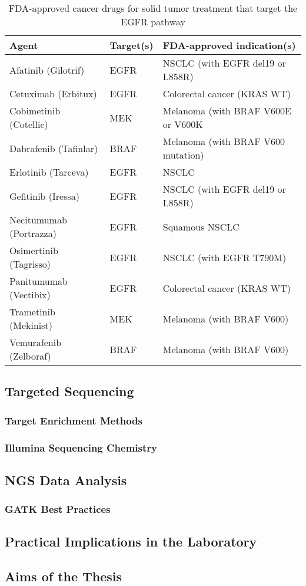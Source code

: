     \begin{table}[!htbp]
        \caption[Targeted Cancer Agents]{FDA-approved cancer drugs for solid tumor treatment that target the EGFR pathway}
        \centering
        \begin{tabular}{ |p{4cm}|p{3.7cm}|p{6.3cm}|}
        \hline
        Agent & Target(s) & FDA-approved indication(s) \\ \hline \hline
        Afatinib (Gilotrif) & EGFR & NSCLC (with EGFR del19 or L858R) \\
        Cetuximab (Erbitux) & EGFR & Colorectal cancer (KRAS WT) \\
        Cobimetinib (Cotellic) & MEK & Melanoma (with BRAF V600E or V600K \\
        Dabrafenib (Tafinlar) & BRAF & Melanoma (with BRAF V600 mutation) \\
        Erlotinib (Tarceva) & EGFR & NSCLC \\
        Gefitinib (Iressa) & EGFR & NSCLC (with EGFR del19 or L858R) \\
        Necitumumab (Portrazza) & EGFR & Squamous NSCLC \\
        Osimertinib (Tagrisso) & EGFR & NSCLC (with EGFR T790M) \\
        Panitumumab (Vectibix) & EGFR & Colorectal cancer (KRAS WT) \\
        Trametinib (Mekinist) & MEK & Melanoma (with BRAF V600) \\
        Vemurafenib (Zelboraf) & BRAF & Melanoma (with BRAF V600) \\
        \hline
      \end{tabular}
    \end{table}

  \subsection{Targeted Sequencing}

    \subsubsection{Target Enrichment Methods}

    \subsubsection{Illumina Sequencing Chemistry}

  \subsection{NGS Data Analysis}

    \subsubsection{GATK Best Practices}

  \subsection{Practical Implications in the Laboratory}

  \subsection{Aims of the Thesis}
